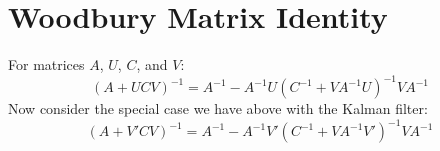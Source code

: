 \documentclass[a4paper,12pt]{article}
\begin{document}
%
%
%
%
%
%
%
%
%
%
%
%
%
%
\section{Woodbury Matrix Identity}

For matrices $A$, $U$, $C$, and $V$:
\begin{equation}
    (A+UCV)^{-1} = A^{-1} - A^{-1} U(C^{-1} + VA^{-1}U)^{-1}
	VA^{-1}
\end{equation}
Now consider the special case we have above with the
Kalman filter:
\begin{equation}
    \label{special}
    (A + V'CV)^{-1} = A^{-1} - A^{-1} V'(C^{-1} + VA^{-1}V')^{-1}
	VA^{-1}
\end{equation}
\end{document}

